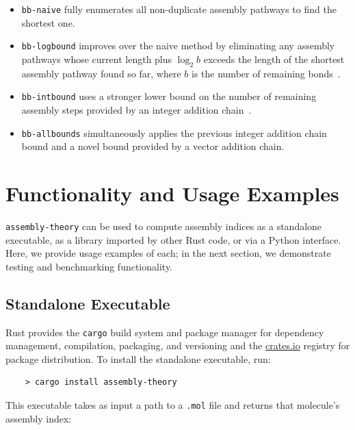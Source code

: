 \documentclass[acmsmall,nonacm,screen]{acmart}  %
\begin{document}
\begin{itemize}
    \item \texttt{bb-naive} fully enumerates all non-duplicate assembly pathways to find the shortest one.
    \item \texttt{bb-logbound} improves over the naive method by eliminating any assembly pathways whose current length plus $\log_2b$ exceeds the length of the shortest assembly pathway found so far, where $b$ is the number of remaining bonds~\cite{Jirasek2024-investigatingquantifying}.
    \item \texttt{bb-intbound} uses a stronger lower bound on the number of remaining assembly steps provided by an integer addition chain~\cite{Seet2024-rapidcomputation}.
    \item \texttt{bb-allbounds} simultaneously applies the previous integer addition chain bound and a novel bound provided by a vector addition chain.
\end{itemize}




\section{Functionality and Usage Examples} \label{sec:usage}

\texttt{assembly-theory} can be used to compute assembly indices as a standalone executable, as a library imported by other Rust code, or via a Python interface.
Here, we provide usage examples of each; in the next section, we demonstrate testing and benchmarking functionality.



\subsection{Standalone Executable} \label{subsec:standalone}

Rust provides the \texttt{cargo} build system and package manager for dependency management, compilation, packaging, and versioning and the \href{https://crates.io/crates/assembly-theory}{crates.io} registry for package distribution.
To install the standalone executable, run:

\begin{verbatim}
    > cargo install assembly-theory
\end{verbatim}

This executable takes as input a path to a \texttt{.mol} file and returns that molecule's assembly index:
\end{document}
